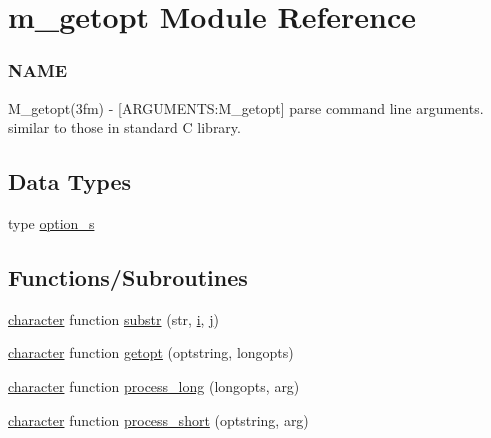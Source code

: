 \hypertarget{namespacem__getopt}{}\section{m\+\_\+getopt Module Reference}
\label{namespacem__getopt}


\subsubsection*{N\+A\+ME}

M\+\_\+getopt(3fm) -\/ \mbox{[}A\+R\+G\+U\+M\+E\+N\+TS\+:M\+\_\+getopt\mbox{]} parse command line arguments. similar to those in standard C library.  


\subsection*{Data Types}
\begin{DoxyCompactItemize}
\item 
type \hyperlink{structm__getopt_1_1option__s}{option\+\_\+s}
\end{DoxyCompactItemize}
\subsection*{Functions/\+Subroutines}
\begin{DoxyCompactItemize}
\item 
\hyperlink{option__stopwatch_83_8txt_abd4b21fbbd175834027b5224bfe97e66}{character} function \hyperlink{namespacem__getopt_a20145e0f477d81541fbe9b408f2194d0}{substr} (str, \hyperlink{intro__blas1_83_8txt_a8ba82a50c0c2c12d5f6a77f7e4651c0b}{i}, \hyperlink{exit_87_8txt_a8921ef29c441e427867c54bd3b2462ba}{j})
\item 
\hyperlink{option__stopwatch_83_8txt_abd4b21fbbd175834027b5224bfe97e66}{character} function \hyperlink{namespacem__getopt_a00e4c1d7d61539e0bdf63a6ee13284d2}{getopt} (optstring, longopts)
\item 
\hyperlink{option__stopwatch_83_8txt_abd4b21fbbd175834027b5224bfe97e66}{character} function \hyperlink{namespacem__getopt_a47714553b3cda11df4d21bc343760d9c}{process\+\_\+long} (longopts, arg)
\item 
\hyperlink{option__stopwatch_83_8txt_abd4b21fbbd175834027b5224bfe97e66}{character} function \hyperlink{namespacem__getopt_a5a41350043ae3b92dbbac7dea6702e09}{process\+\_\+short} (optstring, arg)
\end{DoxyCompactItemize}
